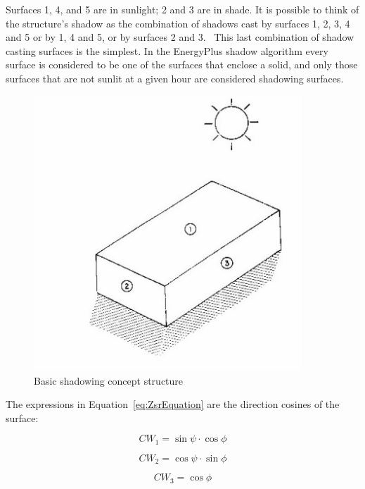 Surfaces 1, 4, and 5 are in sunlight; 2 and 3 are in shade. It is possible to think of the structure's shadow as the combination of shadows cast by surfaces 1, 2, 3, 4 and 5 or by 1, 4 and 5, or by surfaces 2 and 3.~ This last combination of shadow casting surfaces is the simplest. In the EnergyPlus shadow algorithm every surface is considered to be one of the surfaces that enclose a solid, and only those surfaces that are not sunlit at a given hour are considered shadowing surfaces.

\begin{figure}[hbtp] %
\centering
\includegraphics[width=0.9\textwidth, height=0.9\textheight, keepaspectratio=true]{media/image622.png}
\caption{Basic shadowing concept structure \protect \label{fig:basic-shadowing-concept-structure}}
\end{figure}

The expressions in Equation~\ref{eq:ZsrEquation} are the direction cosines of the surface:

\begin{equation}
C{W_1} = \sin \psi \cdot \cos \phi
\end{equation}

\begin{equation}
C{W_2} = \cos \psi \cdot \sin \phi
\end{equation}

\begin{equation}
C{W_3} = \cos \phi
\end{equation}

